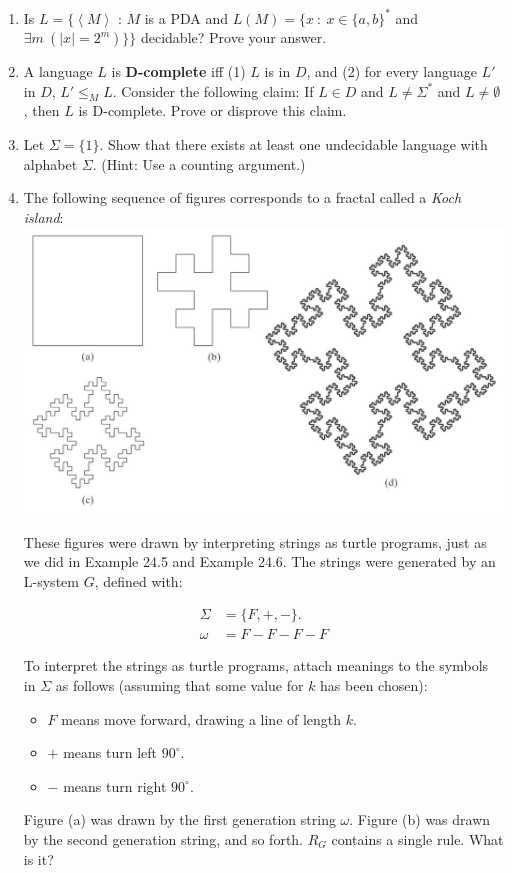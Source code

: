 \documentclass[10pt]{article}
\newcommand{\card}[1]{\left| #1 \right|}
\newcommand{\brackets}[1]{\left< #1 \right>}
\begin{document}
\begin{enumerate}[1)]

\item
Is $L = \{\brackets{M}$ : $M$ is a PDA and $L(M) = \{x\ :\ x \in \{a, b\}^*$ and $\exists m\ (\card{x} = 2^m)\}\}$ decidable?  Prove your answer.


\item
A language $L$ is \textbf{D-complete} iff (1)  $L$ is in $D$, and (2) for every language  $L'$ in $D$,  $L' \leq _M L$.  Consider the following claim: If $L \in D$ and $L \neq \Sigma ^*$ and $L \neq \emptyset$, then $L$ is D-complete.  Prove or disprove this claim.


\item
Let $\Sigma = \{1\}$.  Show that there exists at least one undecidable language with alphabet $\Sigma$.   (Hint: Use a counting argument.)

\pagebreak

\item
The following sequence of figures corresponds to a fractal called a \textit{Koch island}:\\

\includegraphics[scale=.4]{images/p8.png}

These figures were drawn by interpreting strings as turtle programs, just as we did in Example 24.5 and Example 24.6.  The strings were generated by an L-system $G$, defined with:

\begin{align*}
\Sigma &= \{F, +, -\}.\\
\omega &= F - F - F - F
\end{align*}

To interpret the strings as turtle programs, attach meanings to the symbols in $\Sigma$ as follows (assuming that some value for $k$ has been chosen):
\begin{itemize}
\item
$F$ means move forward, drawing a line of length $k$.
\item
$+$ means turn left $90^\circ$.
\item
$-$ means turn right $90^\circ$.
\end{itemize}

Figure (a) was drawn by the first generation string $\omega$.  Figure (b) was drawn by the second generation string, and so forth.  $R_G$ contains a single rule.  What is it?
\end{enumerate}
\end{document}
